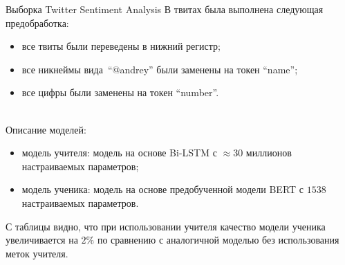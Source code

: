 \documentclass[10pt,pdf,hyperref={unicode}]{beamer}
\begin{document}
\begin{frame}{Выборка Twitter Sentiment Analysis}
\justifying
В твитах была выполнена следующая предобработка:
\begin{itemize}
	\item все твиты были переведены в нижний регистр;
	\item все никнеймы вида~``@andrey'' были заменены на токен ``name'';
	\item все цифры были заменены на токен ``number''.
\end{itemize}

~\\
Описание моделей:
\begin{itemize}
	\item модель учителя: модель на основе Bi-LSTM с $\approx 30$ миллионов настраиваемых параметров;
	\item модель ученика: модель на основе предобученной модели BERT с $1538$ настраиваемых параметров.
\end{itemize}

\begin{table}[]
\begin{center}
\end{center}
\end{table}
С таблицы видно, что при использовании учителя качество модели ученика увеличивается на $2\%$ по сравнению с аналогичной моделью без использования меток учителя.
\end{frame}
\end{document}
